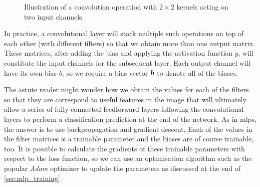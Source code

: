 \documentclass[../main.tex]{subfiles}
\begin{document}
\begin{figure}
    \caption[Illustration of a convolution operation acting on two input channels.]{Illustration of a convolution operation with $2\times 2$ kernels acting on two input channels.}
    \label{fig:conv_multiple_channels}
\end{figure}
In practice, a convolutional layer will stack multiple such operations on top of each other (with different filters) so that we obtain more than one output matrix.
These matrices, after adding the bias and applying the activation function $g$, will constitute the input channels for the subsequent layer.
Each output channel will have its own bias $b$, so we require a bias vector ${\bm{b}}$ to denote all of the biases.

The astute reader might wonder how we obtain the values for each of the filters so that they are correspond to useful features in the image that will ultimately allow a series of fully-connected feedforward layers following the convolutional layers to perform a classification prediction at the end of the network.
As in \glspl{mlp}, the answer is to use backpropagation and gradient descent.
Each of the values in the filter matrices is a trainable parameter and the biases are of course trainable, too.
It is possible to calculate the gradients of these trainable parameters with respect to the loss function, so we can use an optimisation algorithm such as the popular \emph{Adam} optimizer \cite{kingma2017} to update the parameters as discussed at the end of \cref{sec:mlp_training}.
\end{document}

